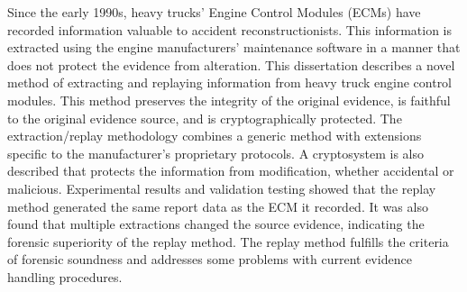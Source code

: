 Since the early 1990s, heavy trucks' Engine Control Modules (ECMs) have recorded information valuable to accident
reconstructionists. This information is extracted using the engine manufacturers' maintenance software in
a manner that does not protect the evidence from alteration. This dissertation describes a novel method
of extracting and replaying information from heavy truck engine control modules. This method preserves
the integrity of the original evidence, is faithful to the original evidence source, and is cryptographically
protected. The extraction/replay methodology combines a generic method with extensions specific to
the manufacturer's proprietary protocols.
A cryptosystem is also described that protects the information from modification, whether accidental or malicious.
Experimental results and validation testing showed that the replay method generated the same report data as the ECM it recorded. It was also found that
multiple extractions changed the source evidence, indicating the forensic superiority of the replay method.
The replay method fulfills the criteria of forensic soundness and addresses some problems with current
evidence handling procedures.
